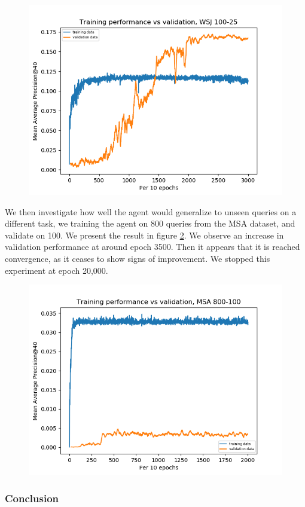 \begin{figure}[H]
	\centering
	\includegraphics[width=0.7\linewidth]{images/chapter_4/second_system/train_vs_valid_100-25}
	\caption{}
	\label{fig:trainvsvalid100-25}
\end{figure}

We then investigate how well the agent would generalize to unseen queries on a different task, we training the agent on 800 queries from the MSA dataset, and validate on 100. We present the result in figure \ref{fig:trainvsvalid800-100}. We observe an increase in validation performance at around epoch 3500. Then it appears that it is reached convergence, as it ceases to show signs of improvement. We stopped this experiment at epoch 20,000.

\begin{figure}[H]
	\centering
	\includegraphics[width=0.7\linewidth]{images/chapter_4/second_system/train_vs_valid_800-100}
	\caption{}
	\label{fig:trainvsvalid800-100}
\end{figure}





\subsubsection{Conclusion}

